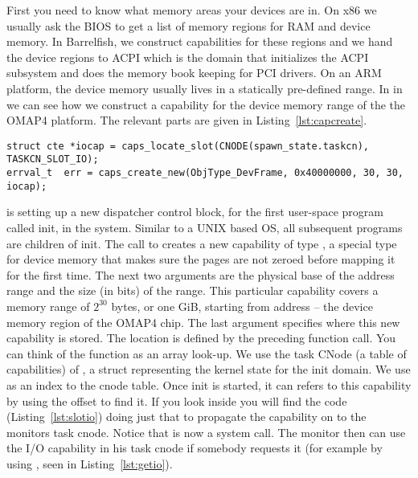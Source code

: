 \documentclass[a4paper,11pt,twoside]{report}
\begin{document}
First you need to know what memory areas your devices are in. On x86 we
usually ask the BIOS to get a list of memory regions for RAM and device
memory. In Barrelfish, we construct capabilities for these regions and we hand
the device regions to ACPI which is the domain that initializes the ACPI
subsystem and does the memory book keeping for PCI drivers. On an ARM
platform, the device memory usually lives in a statically pre-defined range.
In  in
 we can see how we construct a capability for the
device memory range of the the OMAP4 platform. The relevant parts are
given in Listing~\ref{lst:capcreate}.

\begin{lstlisting}[caption={Creating a cabaility in the kernel and placing
it in the I/O slot in a task cnode.}, label={lst:capcreate}]
struct cte *iocap = caps_locate_slot(CNODE(spawn_state.taskcn), TASKCN_SLOT_IO);
errval_t  err = caps_create_new(ObjType_DevFrame, 0x40000000, 30, 30, iocap);
\end{lstlisting}

 is setting up a new dispatcher control block, for
the first user-space program called init, in the system. Similar to a UNIX
based OS, all subsequent programs are children of init. The call to
 creates a new capability of type
, a special type for device memory that makes sure
the pages are not zeroed before mapping it for the first time. The next two
arguments are the physical base of the address range and the size (in bits) of
the range. This particular capability covers a memory range of $2^{30}$ bytes,
or one GiB, starting from address  -- the device memory
region of the OMAP4 chip. The last argument specifies where this new
capability is stored. The location is defined by the preceding
 function call. You can think of the
 function as an array look-up. We use the task
CNode (a table of capabilities) of , a struct
representing the kernel state for the init domain. We use
  as an index to the cnode table. Once init is
started, it can refers to this capability by using the 
offset to find it. If you look inside  you will
find the code (Listing~\ref{lst:slotio}) doing just that to propagate the capability on to the monitors task cnode. Notice that  is
now a system call. The monitor then can use the I/O capability in
his task cnode if somebody requests it (for example by using ,
seen in Listing~\ref{lst:getio}).
\end{document}
